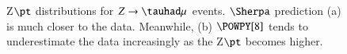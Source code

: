 \begin{figure}[htbp]
	\centering
	\hfill
	\caption{Z$\pt$ distributions for $Z\to\tauhad\mu$ events. $\Sherpa$ prediction (a) is much closer to the data. Meanwhile, (b) $\POWPY[8]$ tends to underestimate the data increasingly as the Z$\pt$ becomes higher. }
	\label{Fig11}
\end{figure}
